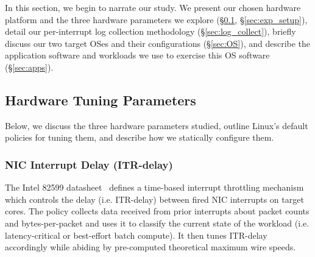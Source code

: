 
In this section, we begin to narrate our study.
We present our chosen hardware platform and the three hardware parameters we explore (\S\ref{sec:knobs}, \S\ref{sec:exp_setup}),
detail our per-interrupt log collection methodology (\S\ref{sec:log_collect}),
briefly discuss our two target OSes and their configurations (\S\ref{sec:OS}),
and describe the application software and workloads we use to exercise this OS software (\S\ref{sec:apps}).


\subsection{Hardware Tuning Parameters}
\label{sec:knobs}
Below, we discuss the three hardware parameters studied,
outline Linux's default policies for tuning them,
and describe how we statically configure them. 

\subsubsection{NIC Interrupt Delay (ITR-delay)}
\label{sec:knobs_itr}
The Intel 82599 datasheet~\cite{82599}
defines a time-based interrupt throttling mechanism
which controls the delay (i.e. ITR-delay)
between fired NIC interrupts on target cores.
The policy collects data received from prior interrupts
about packet counts and bytes-per-packet
and uses it to classify the current state of the workload
(i.e. latency-critical or best-effort batch compute).
It then tunes ITR-delay accordingly
while abiding by pre-computed theoretical maximum wire speeds.

